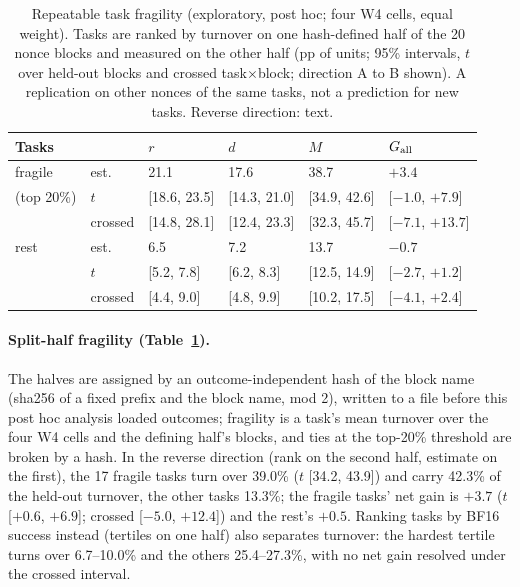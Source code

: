 \begin{table}[t]
\centering%
\renewcommand{\arraystretch}{1.12}\fontsize{8.5}{10}\selectfont\setlength{\tabcolsep}{4pt}
\begin{tabular}{@{}llllll@{}}
\toprule
Tasks & & $r$ & $d$ & $M$ & $G_{\mathrm{all}}$ \\
\midrule
fragile & est. & 21.1 & 17.6 & 38.7 & $+3.4$ \\
(top 20\%) & $t$ & [18.6, 23.5] & [14.3, 21.0] & [34.9, 42.6] & [$-1.0$, $+7.9$] \\
 & crossed & [14.8, 28.1] & [12.4, 23.3] & [32.3, 45.7] & [$-7.1$, $+13.7$] \\
\midrule
rest & est. & 6.5 & 7.2 & 13.7 & $-0.7$ \\
 & $t$ & [5.2, 7.8] & [6.2, 8.3] & [12.5, 14.9] & [$-2.7$, $+1.2$] \\
 & crossed & [4.4, 9.0] & [4.8, 9.9] & [10.2, 17.5] & [$-4.1$, $+2.4$] \\
\bottomrule
\end{tabular}
\caption{Repeatable task fragility (exploratory, post hoc; four \tautwo{} W4 cells, equal weight). Tasks are ranked by turnover on one hash-defined half of the 20 nonce blocks and measured on the other half (pp of units; 95\% intervals, $t$ over held-out blocks and crossed task$\times$block; direction A to B shown). A replication on other nonces of the same tasks, not a prediction for new tasks. Reverse direction: text.}
\label{tab:fragility}
\end{table}

\paragraph{Split-half fragility (Table~\ref{tab:fragility}).} The halves are assigned by an outcome-independent hash of the block name (sha256 of a fixed prefix and the block name, mod 2), written to a file before this post hoc analysis loaded outcomes; fragility is a task's mean turnover over the four W4 cells and the defining half's blocks, and ties at the top-20\% threshold are broken by a hash. In the reverse direction (rank on the second half, estimate on the first), the 17 fragile tasks turn over 39.0\% ($t$ [34.2, 43.9]) and carry 42.3\% of the held-out turnover, the other tasks 13.3\%; the fragile tasks' net gain is $+3.7$\pp{} ($t$ [$+0.6$, $+6.9$]; crossed [$-5.0$, $+12.4$]) and the rest's $+0.5$. Ranking tasks by BF16 success instead (tertiles on one half) also separates turnover: the hardest tertile turns over 6.7--10.0\% and the others 25.4--27.3\%, with no net gain resolved under the crossed interval. %



